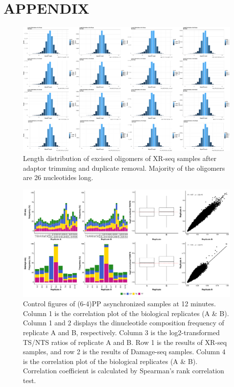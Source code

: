 \setlength{\parindent}{0pt}
\chapter{\bf APPENDIX} 

\shorthandoff{=}

\begin{figure}[H]
\begin{center}
\includegraphics[width=\textwidth]{Chapters/7_appendix/figures/supfig1}
\caption[Length distribution of excised oligomers of XR-seq samples.]{Length distribution of excised oligomers of XR-seq samples after adaptor trimming and duplicate removal. Majority of the oligomers are 26 nucleotides long.}
\label{supfig:length}
\end{center}
\end{figure}


\begin{figure}[H]
\begin{center}
\includegraphics[width=\textwidth]{Chapters/7_appendix/figures/supfig2}
\caption[Control figures of (6-4)PP asynchronized samples at 12 minutes.]{Control figures of (6-4)PP asynchronized samples at 12 minutes. Column 1 is the correlation plot of the biological replicates (A \& B). Column 1 and 2 displays the dinucleotide composition frequency of replicate A and B, respectively. Column 3 is the log2-transformed TS/NTS ratios of replicate A and B. Row 1 is the results of XR-seq samples, and row 2 is the results of Damage-seq samples. Column 4 is the correlation plot of the biological replicates (A \& B). Correlation coefficient is calculated by Spearman’s rank correlation test.}
\label{supfig:control1}
\end{center}
\end{figure}


